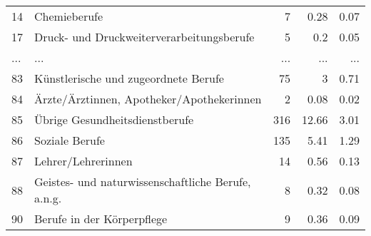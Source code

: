 \begin{longtable}{lXrrr}
        14 & \multicolumn{1}{X}{Chemieberufe} & %
          \num{7} &
          \num[round-mode=places,round-precision=2]{0.28} &
          \num[round-mode=places,round-precision=2]{0.07} \\
        17 & \multicolumn{1}{X}{Druck- und Druckweiterverarbeitungsberufe} & %
          \num{5} &
          \num[round-mode=places,round-precision=2]{0.2} &
          \num[round-mode=places,round-precision=2]{0.05} \\
       ... & ... & ... & ... & ... \\
        83 & \multicolumn{1}{X}{Künstlerische und zugeordnete Berufe} & %
          \num{75} &
          \num[round-mode=places,round-precision=2]{3} &
          \num[round-mode=places,round-precision=2]{0.71} \\

        84 & \multicolumn{1}{X}{Ärzte/Ärztinnen, Apotheker/Apothekerinnen} & %
          \num{2} &
          \num[round-mode=places,round-precision=2]{0.08} &
          \num[round-mode=places,round-precision=2]{0.02} \\

        85 & \multicolumn{1}{X}{Übrige Gesundheitsdienstberufe} & %
          \num{316} &
          \num[round-mode=places,round-precision=2]{12.66} &
          \num[round-mode=places,round-precision=2]{3.01} \\

        86 & \multicolumn{1}{X}{Soziale Berufe} & %
          \num{135} &
          \num[round-mode=places,round-precision=2]{5.41} &
          \num[round-mode=places,round-precision=2]{1.29} \\

        87 & \multicolumn{1}{X}{Lehrer/Lehrerinnen} & %
          \num{14} &
          \num[round-mode=places,round-precision=2]{0.56} &
          \num[round-mode=places,round-precision=2]{0.13} \\

        88 & \multicolumn{1}{X}{Geistes- und naturwissenschaftliche Berufe, a.n.g.} & %
          \num{8} &
          \num[round-mode=places,round-precision=2]{0.32} &
          \num[round-mode=places,round-precision=2]{0.08} \\

        90 & \multicolumn{1}{X}{Berufe in der Körperpflege} & %
          \num{9} &
          \num[round-mode=places,round-precision=2]{0.36} &
          \num[round-mode=places,round-precision=2]{0.09} \\


\end{longtable}
